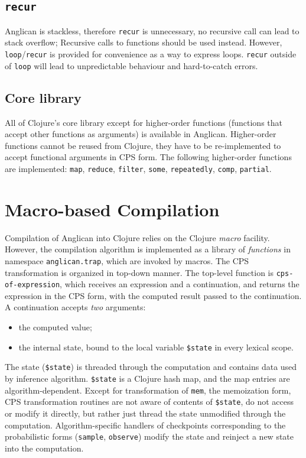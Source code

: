 \documentclass[preprint]{sigplanconf}
\begin{document}
\subsection{\texttt{recur}}

Anglican is stackless, therefore \texttt{recur} is
unnecessary, no recursive call can lead to stack overflow;
Recursive calls to functions should be used instead. However,
\texttt{loop}/\texttt{recur} is provided for convenience as a way to express
loops. \texttt{recur} outside of \texttt{loop} will lead to unpredictable
behaviour and hard-to-catch errors.

\subsection{Core library}

All of Clojure's core library except for higher-order functions
(functions that accept other functions as arguments) is
available in Anglican. Higher-order functions cannot be reused
from Clojure, they have to be re-implemented to accept
functional arguments in CPS form. The following higher-order
functions are implemented: \texttt{map}, \texttt{reduce},
\texttt{filter}, \texttt{some}, \texttt{repeatedly},
\texttt{comp}, \texttt{partial}.

\section{Macro-based Compilation}

Compilation of Anglican into Clojure relies on the Clojure
\textit{macro} facility. However, the compilation algorithm is
implemented as a library of \textit{functions} in namespace
\texttt{anglican.trap}, which are invoked by macros.
The CPS transformation is organized in top-down manner. The
top-level function is  \texttt{cps-of-expression}, which
receives an expression and a continuation, and returns the
expression in the CPS form, with the computed result passed to
the continuation. A continuation accepts \textit{two} arguments:
\begin{itemize}
    \item the computed value;
    \item the internal state, bound to the local variable
        \texttt{\$state} in every lexical scope.
\end{itemize}
The state (\texttt{\$state}) is threaded through the computation
and contains data used by inference algorithm. \texttt{\$state}
is a Clojure hash map, and the map entries are
algorithm-dependent. Except for transformation of
\texttt{mem}, the memoization form, CPS transformation routines
are not aware of contents of \texttt{\$state}, do not access or
modify it directly, but rather just thread the state unmodified
through the computation. Algorithm-specific handlers of
checkpoints corresponding to the probabilistic forms
(\texttt{sample}, \texttt{observe}) modify the
state and reinject a new state into the computation.
\end{document}

